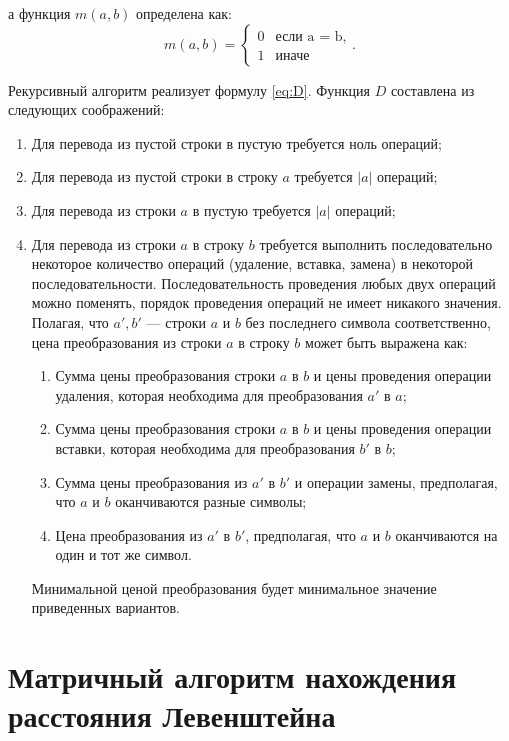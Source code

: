 а функция $m(a, b)$ определена как:
\begin{equation}
    \label{eq:m}
    m(a, b) = \begin{cases}
                  0 &\text{если a = b,}\\
                  1 &\text{иначе}
    \end{cases}.
\end{equation}

Рекурсивный алгоритм реализует формулу \eqref{eq:D}.
Функция $D$ составлена из следующих соображений:
\begin{enumerate}
    \item Для перевода из пустой строки в пустую требуется ноль операций;
    \item Для перевода из пустой строки в строку $a$ требуется $|a|$ операций;
    \item Для перевода из строки $a$ в пустую требуется $|a|$ операций;
    \item Для перевода из строки $a$ в строку $b$ требуется выполнить последовательно некоторое количество операций (удаление, вставка, замена)
    в некоторой последовательности. Последовательность проведения любых двух операций можно поменять,
    порядок проведения операций не имеет никакого значения. Полагая,
    что $a', b'$  — строки $a$ и $b$ без последнего символа соответственно,
    цена преобразования из строки $a$ в строку $b$ может быть выражена как:
    \begin{enumerate}
        \item Сумма цены преобразования строки $a$ в $b$ и цены проведения операции удаления, которая необходима для преобразования $a'$ в $a$;
        \item Сумма цены преобразования строки $a$ в $b$  и цены проведения операции вставки, которая необходима для преобразования $b'$ в $b$;
        \item Сумма цены преобразования из $a'$ в $b'$ и операции замены, предполагая, что $a$ и $b$ оканчиваются разные символы;
        \item Цена преобразования из $a'$ в $b'$, предполагая, что $a$ и $b$ оканчиваются на один и тот же символ.
    \end{enumerate}
    Минимальной ценой преобразования будет минимальное
    значение приведенных вариантов.
\end{enumerate}

\section{Матричный алгоритм нахождения расстояния Левенштейна}

